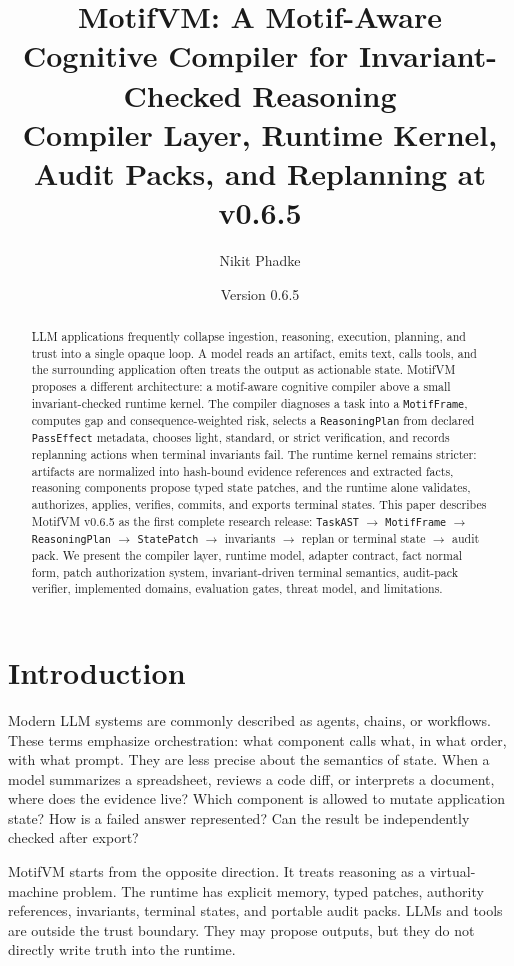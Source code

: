 \documentclass[11pt]{article}
\title{\textbf{MotifVM: A Motif-Aware Cognitive Compiler for Invariant-Checked Reasoning}\\
\large Compiler Layer, Runtime Kernel, Audit Packs, and Replanning at v0.6.5}
\author{Nikit Phadke}
\date{Version 0.6.5}
\begin{document}
\maketitle

\begin{abstract}
LLM applications frequently collapse ingestion, reasoning, execution, planning, and trust into a single opaque loop. A model reads an artifact, emits text, calls tools, and the surrounding application often treats the output as actionable state. MotifVM proposes a different architecture: a motif-aware cognitive compiler above a small invariant-checked runtime kernel. The compiler diagnoses a task into a \texttt{MotifFrame}, computes gap and consequence-weighted risk, selects a \texttt{ReasoningPlan} from declared \texttt{PassEffect} metadata, chooses light, standard, or strict verification, and records replanning actions when terminal invariants fail. The runtime kernel remains stricter: artifacts are normalized into hash-bound evidence references and extracted facts, reasoning components propose typed state patches, and the runtime alone validates, authorizes, applies, verifies, commits, and exports terminal states. This paper describes MotifVM v0.6.5 as the first complete research release: \texttt{TaskAST} $\rightarrow$ \texttt{MotifFrame} $\rightarrow$ \texttt{ReasoningPlan} $\rightarrow$ \texttt{StatePatch} $\rightarrow$ invariants $\rightarrow$ replan or terminal state $\rightarrow$ audit pack. We present the compiler layer, runtime model, adapter contract, fact normal form, patch authorization system, invariant-driven terminal semantics, audit-pack verifier, implemented domains, evaluation gates, threat model, and limitations.
\end{abstract}

\section{Introduction}

Modern LLM systems are commonly described as agents, chains, or workflows. These terms emphasize orchestration: what component calls what, in what order, with what prompt. They are less precise about the semantics of state. When a model summarizes a spreadsheet, reviews a code diff, or interprets a document, where does the evidence live? Which component is allowed to mutate application state? How is a failed answer represented? Can the result be independently checked after export?

MotifVM starts from the opposite direction. It treats reasoning as a virtual-machine problem. The runtime has explicit memory, typed patches, authority references, invariants, terminal states, and portable audit packs. LLMs and tools are outside the trust boundary. They may propose outputs, but they do not directly write truth into the runtime.
\end{document}

